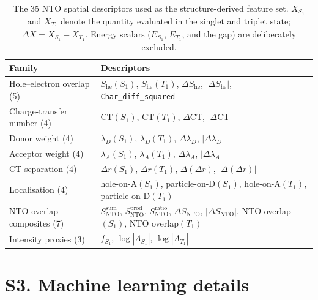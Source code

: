\documentclass[twoside,twocolumn,9pt]{extarticle}
\begin{document}
\begin{table}[htbp]
  \centering
  \caption{The \num{35} NTO spatial descriptors used as the structure-derived
    feature set. $X_{S_1}$ and $X_{T_1}$ denote the quantity evaluated in the
    singlet and triplet state; $\Delta X = X_{S_1}-X_{T_1}$. Energy scalars
    ($E_{S_1}$, $E_{T_1}$, and the gap) are deliberately excluded.}
  \label{tab:descriptors}
  \footnotesize
  \begin{tabular}{p{}p{}}
    \toprule
    Family & Descriptors \\
    \midrule
    Hole--electron overlap (5)
      & $S_\text{he}(S_1)$, $S_\text{he}(T_1)$, $\Delta S_\text{he}$,
        $|\Delta S_\text{he}|$, \texttt{Char\_diff\_squared} \\
    \addlinespace
    Charge-transfer number (4)
      & $\text{CT}(S_1)$, $\text{CT}(T_1)$, $\Delta\text{CT}$, $|\Delta\text{CT}|$ \\
    \addlinespace
    Donor weight (4)
      & $\lambda_D(S_1)$, $\lambda_D(T_1)$, $\Delta\lambda_D$, $|\Delta\lambda_D|$ \\
    \addlinespace
    Acceptor weight (4)
      & $\lambda_A(S_1)$, $\lambda_A(T_1)$, $\Delta\lambda_A$, $|\Delta\lambda_A|$ \\
    \addlinespace
    CT separation (4)
      & $\Delta r(S_1)$, $\Delta r(T_1)$, $\Delta(\Delta r)$, $|\Delta(\Delta r)|$ \\
    \addlinespace
    Localisation (4)
      & hole-on-A$(S_1)$, particle-on-D$(S_1)$,
        hole-on-A$(T_1)$, particle-on-D$(T_1)$ \\
    \addlinespace
    NTO overlap composites (7)
      & $S_\text{NTO}^{\text{sum}}$, $S_\text{NTO}^{\text{prod}}$,
        $S_\text{NTO}^{\text{ratio}}$, $\Delta S_\text{NTO}$,
        $|\Delta S_\text{NTO}|$, NTO overlap$(S_1)$, NTO overlap$(T_1)$ \\
    \addlinespace
    Intensity proxies (3)
      & $f_{S_1}$, $\log|A_{S_1}|$, $\log|A_{T_1}|$ \\
    \bottomrule
  \end{tabular}
\end{table}

\section*{S3. Machine learning details}
\end{document}
